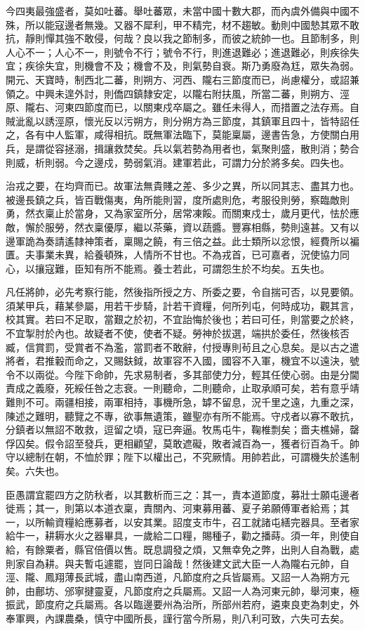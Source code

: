 \begin{pinyinscope}
 今四夷最強盛者，莫如吐蕃。舉吐蕃眾，未當中國十數大郡，而內虞外備與中國不殊，所以能寇邊者無幾。又器不犀利，甲不精完，材不趨敏。動則中國慹其眾不敢抗，靜則憚其強不敢侵，何哉？良以我之節制多，而彼之統帥一也。且節制多，則人心不一；人心不一，則號令不行；號令不行，則進退難必；進退難必，則疾徐失宜；疾徐失宜，則機會不及；機會不及，則氣勢自衰。斯乃勇廢為尪，眾失為弱。開元、天寶時，制西北二蕃，則朔方、河西、隴右三節度而已，尚慮權分，或詔兼領之。中興未遑外討，則僑四鎮隸安定，以隴右附扶風，所當二蕃，則朔方、涇原、隴右、河東四節度而已，以關東戍卒屬之。雖任未得人，而措置之法存焉。自賊泚亂以誘涇原，懷光反以污朔方，則分朔方為三節度，其鎮軍且四十，皆特詔任之，各有中人監軍，咸得相抗。既無軍法臨下，莫能稟屬，邊書告急，方使關白用兵，是謂從容拯溺，揖讓救焚矣。兵以氣若勢為用者也，氣聚則盛，散則消；勢合則威，析則弱。今之邊戍，勢弱氣消。建軍若此，可謂力分於將多矣。四失也。



 治戎之要，在均齊而已。故軍法無貴賤之差、多少之異，所以同其志、盡其力也。被邊長鎮之兵，皆百戰傷夷，角所能則習，度所處則危，考服役則勞，察臨敵則勇，然衣稟止於當身，又為家室所分，居常凍餒。而關東戍士，歲月更代，怯於應敵，懈於服勞，然衣稟優厚，繼以茶藥，資以蔬醬。豐寡相縣，勢則遠甚。又有以邊軍詭為奏請遙隸神策者，稟賜之饒，有三倍之益。此士類所以忿恨，經費所以褊匱。夫事業未異，給養頓殊，人情所不甘也。不為戎首，已可嘉者，況使協力同心，以攘寇難，臣知有所不能焉。養士若此，可謂怨生於不均矣。五失也。



 凡任將帥，必先考察行能，然後指所授之方、所委之要，令自揣可否，以見要領。須某甲兵，藉某參屬，用若干步騎，計若干資糧，何所列屯，何時成功，觀其言，校其實。若曰不足取，當艱之於初，不宜詒悔於後也；若曰可任，則當要之於終，不宜掣肘於內也。故疑者不使，使者不疑。勞神於拔選，端拱於委任，然後核否臧，信賞罰，受賞者不為濫，當罰者不敢辭，付授專則茍且之心息矣。是以古之遣將者，君推轂而命之，又賜鈇鉞，故軍容不入國，國容不入軍，機宜不以遠決，號令不以兩從。今陛下命帥，先求易制者，多其部使力分，輕其任使心弱。由是分閫責成之義廢，死綏任咎之志衰。一則聽命，二則聽命，止取承順可矣，若有意乎靖難則不可。兩疆相接，兩軍相持，事機所急，罅不留息，況千里之遠，九重之深，陳述之難明，聽覽之不專，欲事無遺策，雖聖亦有所不能焉。守戍者以寡不敢抗，分鎮者以無詔不敢救，逗留之頃，寇已奔逼。牧馬屯牛，鞠椎剽矣；嗇夫樵婦，罄俘囚矣。假令詔至發兵，更相顧望，莫敢遮礙，敗者減百為一，獲者衍百為千。帥守以總制在朝，不恤於罪；陛下以權出己，不究厥情。用帥若此，可謂機失於遙制矣。六失也。



 臣愚謂宜罷四方之防秋者，以其數析而三之：其一，責本道節度，募壯士願屯邊者徙焉；其一，則第以本道衣稟，責關內、河東募用蕃、夏子弟願傅軍者給焉；其一，以所輸資糧給應募者，以安其業。詔度支市牛，召工就諸屯繕完器具。至者家給牛一，耕耨水火之器畢具，一歲給二口糧，賜種子，勸之播蒔。須一年，則使自給，有餘粟者，縣官倍價以售。既息調發之煩，又無幸免之弊，出則人自為戰，處則家自為耕。與夫暫屯遽罷，豈同日論哉！然後建文武大臣一人為隴右元帥，自涇、隴、鳳翔薄長武城，盡山南西道，凡節度府之兵皆屬焉。又詔一人為朔方元帥，由鄜坊、邠寧揵靈夏，凡節度府之兵屬焉。又詔一人為河東元帥，舉河東，極振武，節度府之兵屬焉。各以臨邊要州為治所，所部州若府，遴柬良吏為刺史，外奉軍興，內課農桑，慎守中國所長，謹行當今所易，則八利可致，六失可去矣。




\end{pinyinscope}
